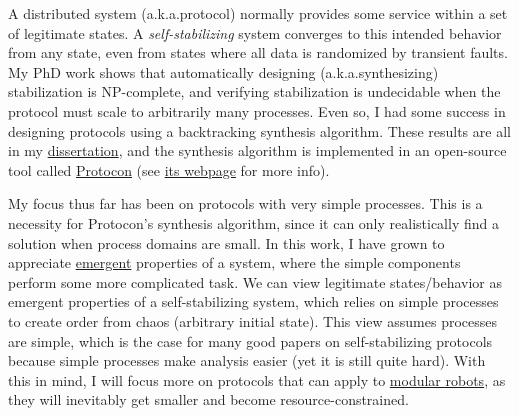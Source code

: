 
\newcommand{\AKA}{a.k.a.}



A distributed system (\AKA protocol) normally provides some service within a set of legitimate states.
A \textit{self-stabilizing} system converges to this intended behavior from any state, even from states where all data is randomized by transient faults.
My PhD work shows that automatically designing (\AKA synthesizing) stabilization is NP-complete, and verifying stabilization is undecidable when the protocol must scale to arbitrarily many processes.
Even so, I had some success in designing protocols using a backtracking synthesis algorithm.
These results are all in my \href{limpract.pdf}{dissertation}, and the synthesis algorithm is implemented in an open-source tool called
\href{https://github.com/grencez/protocon}{Protocon} (see \href{http://grencez.github.io/protocon}{its webpage} for more info).

My focus thus far has been on protocols with very simple processes.
This is a necessity for Protocon's synthesis algorithm, since it can only realistically find a solution when process domains are small.
In this work, I have grown to appreciate \href{https://en.wikipedia.org/wiki/Emergence}{emergent} properties of a system, where the simple components perform some more complicated task.
We can view legitimate states/behavior as emergent properties of a self-stabilizing system, which relies on simple processes to create order from chaos (arbitrary initial state).
This view assumes processes are simple, which is the case for many good papers on self-stabilizing protocols because simple processes make analysis easier (yet it is still quite hard).
With this in mind, I will focus more on protocols that can apply to \href{https://en.wikipedia.org/wiki/Self-reconfiguring_modular_robot}{modular robots}, as they will inevitably get smaller and become resource-constrained.


